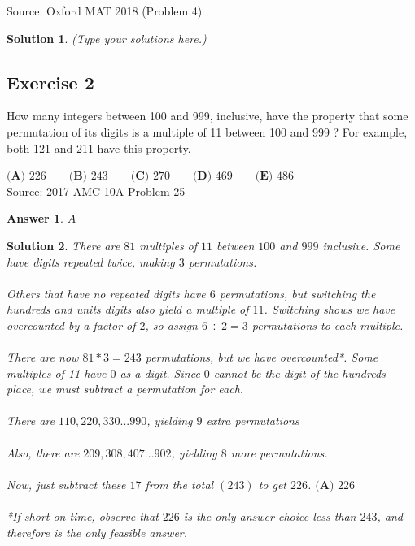 \documentclass[12pt]{article}
\newtheorem*{answer*}{Answer}
\newtheorem*{solution*}{Solution}
\begin{document}
Source: Oxford MAT 2018 (Problem 4)\\

\begin{solution*}
(Type your solutions here.)
\end{solution*}

\vspace{2in}






\subsection*{Exercise 2}
How many integers between 100 and 999, inclusive, have the property
that some permutation of its digits is a multiple of 11 between 100
and 999 ? For example, both 121 and 211 have this property.

$\textbf{(A) } 226 \qquad \textbf{(B) } 243 \qquad \textbf{(C) } 270 \qquad \textbf{(D) } 469 \qquad \textbf{(E) } 486$
\\

Source: 2017 AMC 10A Problem 25\\

\begin{answer*}
$A$
\end{answer*}

\begin{solution*}
There are $81$ multiples of $11$ between $100$ and $999$ inclusive. Some have digits repeated twice, making $3$ permutations.
\\ \\
Others that have no repeated digits have $6$ permutations, but switching the hundreds and units digits also yield a multiple of $11$. Switching shows we have overcounted by a factor of $2$, so assign  $6 \div 2 = 3$ permutations to each multiple.
\\ \\
There are now $81*3 = 243$ permutations, but we have overcounted*. Some multiples of 11 have $0$ as a digit. Since $0$ cannot be the digit of the hundreds place, we must subtract a permutation for each. 
\\ \\
There are $110, 220, 330 ... 990$, yielding $9$ extra permutations
\\ \\
Also, there are $209, 308, 407...902$, yielding $8$ more permutations.
\\ \\
Now, just subtract these $17$ from the total $(243)$ to get $226$. $\boxed{\textbf{(A) } 226}$
\\ \\
*If short on time, observe that $226$ is the only answer choice less than $243$, and therefore is the only feasible answer.
\end{solution*}
\end{document}
